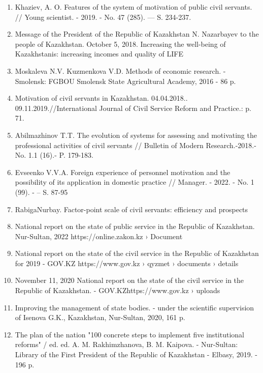 \begin{enumerate}
\item
Khaziev, A. O. Features of the system of motivation of public civil
servants. // Young scientist. - 2019. - No. 47 (285). --- S. 234-237.

\item
Message of the President of the Republic of Kazakhstan N. Nazarbayev
to the people of Kazakhstan. October 5, 2018. Increasing the well-being
of Kazakhstanis: increasing incomes and quality of LIFE

\item
Moskaleva N.V. Kuzmenkova V.D. Methods of economic research. -
Smolensk: FGBOU Smolensk State Agricultural Academy, 2016 - 86 p.

\item
Motivation of civil servants in Kazakhstan. 04.04.2018..
09.11.2019.//International Journal of Civil Service Reform and
Practice.: p. 71.

\item
Abilmazhinov T.T. The evolution of systems for assessing and
motivating the professional activities of civil servants // Bulletin of
Modern Research.-2018.- No. 1.1 (16).- P. 179-183.

\item
Evseenko V.V.A. Foreign experience of personnel motivation and the
possibility of its application in domestic practice // Manager. - 2022.
- No. 1 (99). - -- S. 87-95

\item
RabigaNurbay. Factor-point scale of civil servants: efficiency and
prospects

\item
National report on the state of public service in the Republic of
Kazakhstan. Nur-Sultan, 2022 https://online.zakon.kz › Document

\item
National report on the state of the civil service in the Republic of
Kazakhstan for 2019 - GOV.KZ https://www.gov.kz › qyzmet › documents ›
details

\item
November 11, 2020 National report on the state of the civil service
in the Republic of Kazakhstan. - GOV.KZhttps://www.gov.kz › uploads

\item
Improving the management of state bodies. - under the scientific
supervision of Isenova G.K., Kazakhstan, Nur-Sultan, 2020, 161 p.

\item
The plan of the nation "100 concrete steps to implement five
institutional reforms" / ed. ed. A. M. Rakhimzhanova, B. M. Kaipova. -
Nur-Sultan: Library of the First President of the Republic of Kazakhstan
- Elbasy, 2019. - 196 p.


\end{enumerate}
